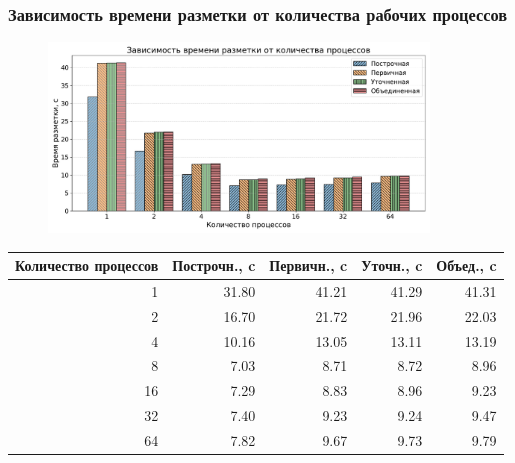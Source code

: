 \documentclass[gray]{beamer}
\begin{document}
\begin{frame}
    \frametitle{Зависимость времени разметки от количества рабочих процессов}
    \begin{figure}[H]
        \centering
        \includegraphics[width=0.9\textwidth]{diag/tama_bar.pdf}
    \end{figure}

    \vspace{-0.5cm}
    \tiny
    \begin{center}
        \begin{tabular}{|r|r|r|r|r|}
            \hline
            \textbf{Количество процессов} & \textbf{Построчн.}, c & \textbf{Первичн.}, c & \textbf{Уточн.}, c & \textbf{Объед., c} \\ \hline
            1 & 31.80 & 41.21 & 41.29 & 41.31 \\ \hline
            2 & 16.70 & 21.72 & 21.96 & 22.03 \\ \hline
            4 & 10.16 & 13.05 & 13.11 & 13.19 \\ \hline
            8 & 7.03 & 8.71 & 8.72 & 8.96 \\ \hline
            16 & 7.29 & 8.83 & 8.96 & 9.23 \\ \hline
            32 & 7.40 & 9.23 & 9.24 & 9.47 \\ \hline
            64 & 7.82 & 9.67 & 9.73 & 9.79 \\ \hline
        \end{tabular}
    \end{center}
\end{frame}
\end{document}
